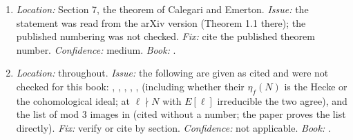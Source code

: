 \begin{sloppypar}
\begin{enumerate}[resume*=errata]
descriptions (3Ns: $\psi_3$ a product of two quadratics; 3Cs.1.1 and 3B.1.1: rational $3$-torsion), but were not compared with the tables of \cite{Sutherland16}, whose row and column conventions
matter for the B labels. \emph{Fix:} give the intrinsic description beside each label (the revision mostly does). \emph{Confidence:} medium. \emph{Book:} .
\item\label{err:paper:ce} \emph{Location:} Section 7, the theorem of Calegari and Emerton. \emph{Issue:} the statement was read from the arXiv version (Theorem 1.1 there); the published numbering was not checked.
\emph{Fix:} cite the published theorem number. \emph{Confidence:} medium. \emph{Book:} .
\item\label{err:paper:as-cited} \emph{Location:} throughout. \emph{Issue:} the following are given as cited and were not checked for this book: \cite[Theorem 3.1(e), Theorem 3.15, Lemma 4.17]{DDT}, \cite[Theorem 3.1]{AtkinLi78},
\cite[Theorem 3]{AtkinLehner70}, \cite[Section 2]{Edixhoven92}, \cite[Theorem 3.5]{RibetStein}, \cite[Theorem 1.1, Definition 2.12]{KimOta} (including whether their $\eta_f(N)$ is the Hecke or the cohomological
ideal; at $\ell\nmid N$ with $E[\ell]$ irreducible the two agree), and the list of mod $3$ images in \cite{Zywina15} (cited without a number; the paper proves the list directly). \emph{Fix:} verify or
cite by section. \emph{Confidence:} not applicable. \emph{Book:} .
\end{enumerate}


\end{sloppypar}
